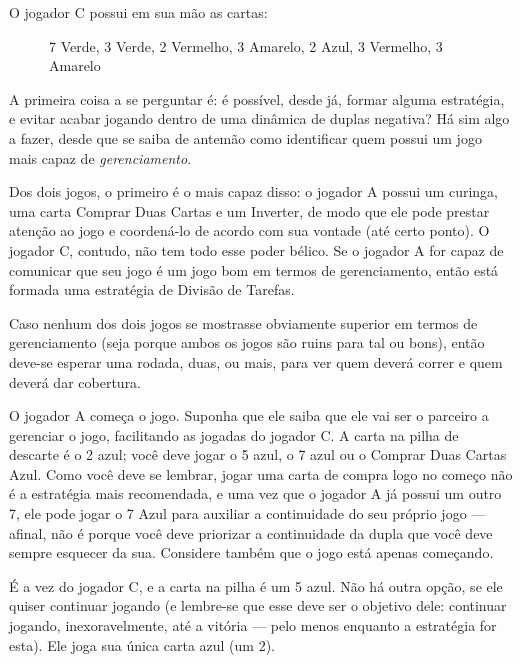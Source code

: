 O jogador C possui em sua mão as cartas:

\begin{figure}[!h]
\centering
{}
\caption{7 Verde, 3 Verde, 2 Vermelho, 3 Amarelo, 2 Azul, 3 Vermelho, 3 Amarelo}
\end{figure}

A primeira coisa a se perguntar é: é possível, desde já, formar alguma estratégia, e evitar acabar jogando dentro de uma dinâmica de duplas negativa? Há sim algo a fazer, desde que se saiba de antemão como identificar quem possui um jogo mais capaz de \emph{gerenciamento}.

Dos dois jogos, o primeiro é o mais capaz disso: o jogador A possui um curinga, uma carta Comprar Duas Cartas e um Inverter, de modo que ele pode prestar atenção ao jogo e coordená-lo de acordo com sua vontade (até certo ponto). O jogador C, contudo, não tem todo esse poder bélico. Se o jogador A for capaz de comunicar que seu jogo é um jogo bom em termos de gerenciamento, então está formada uma estratégia de Divisão de Tarefas.

Caso nenhum dos dois jogos se mostrasse obviamente superior em termos de gerenciamento (seja porque ambos os jogos são ruins para tal ou bons), então deve-se esperar uma rodada, duas, ou mais, para ver quem deverá correr e quem deverá dar cobertura.

O jogador A começa o jogo. Suponha que ele saiba que ele vai ser o parceiro a gerenciar o jogo, facilitando as jogadas do jogador C. A carta na pilha de descarte é o 2 azul; você deve jogar o 5 azul, o 7 azul ou o Comprar Duas Cartas Azul. Como você deve se lembrar, jogar uma carta de compra logo no começo não é a estratégia mais recomendada, e uma vez que o jogador A já possui um outro 7, ele pode jogar o 7 Azul para auxiliar a continuidade do seu próprio jogo --- afinal, não é porque você deve priorizar a continuidade da dupla que você deve sempre esquecer da sua. Considere também que o jogo está apenas começando.

É a vez do jogador C, e a carta na pilha é um 5 azul. Não há outra opção, se ele quiser continuar jogando (e lembre-se que esse deve ser o objetivo dele: continuar jogando, inexoravelmente, até a vitória --- pelo menos enquanto a estratégia for esta). Ele joga sua única carta azul (um 2).

